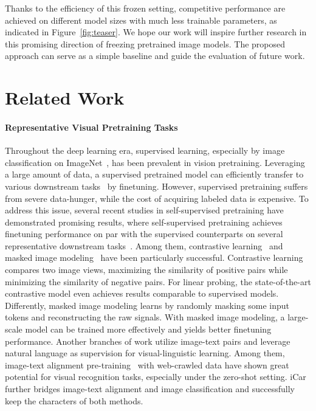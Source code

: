\documentclass{article}
\begin{document}
Thanks to the efficiency of this frozen setting, competitive performance are achieved on different model sizes with much less trainable parameters, as indicated in Figure~\ref{fig:teaser}. We hope our work will inspire further research in this promising direction of freezing pretrained image models. The proposed approach can serve as a simple baseline and guide the evaluation of future work.

\section{Related Work}

\paragraph{Representative Visual Pretraining Tasks}  Throughout the deep learning era, supervised learning, especially by image classification on ImageNet~\cite{deng2009imagenet}, has been prevalent in vision pretraining. Leveraging a large amount of data, a supervised pretrained model can efficiently transfer to various downstream tasks~\cite{donahue2014decaf,kornblith2019better,alex2019big,dosovitskiy2020vit,sermanet2013overfeat,girshick2014rich,liu2021swin,long2015fully,simonyan2014two,carreira2017quo} by finetuning. However, supervised pretraining suffers from severe data-hunger, while the cost of acquiring labeled data is expensive. To address this issue, several recent studies in self-supervised pretraining have demonstrated promising results, where self-supervised pretraining achieves finetuning performance on par with the supervised counterparts on several representative downstream tasks~\cite{he2019moco,chen2020simclr}. Among them, contrastive learning~\cite{dosovitskiy2014exemplarcnn,he2019moco,chen2020simclr,cao2020pic,grill2020byol} and masked image modeling~\cite{chen2020imagegpt,bao2021beit,he2021masked,xie2021simmim} have been particularly successful. Contrastive learning compares two image views, maximizing the similarity of positive pairs while minimizing the similarity of negative pairs. For linear probing, the state-of-the-art contrastive model even achieves results comparable to supervised models. Differently, masked image modeling learns by randomly masking some input tokens and reconstructing the raw signals. With masked image modeling, a large-scale model can be trained more effectively and yields better finetuning performance. Another branches of work utilize image-text pairs and leverage natural language as supervision for visual-linguistic learning. Among them, image-text alignment pre-training~\cite{radford2021clip, jia2021align} with web-crawled data have shown great potential for visual recognition tasks, especially under the zero-shot setting. iCar~\cite{yixuan2022icar} further bridges image-text alignment and image classification and successfully keep the characters of both methods.
\end{document}
